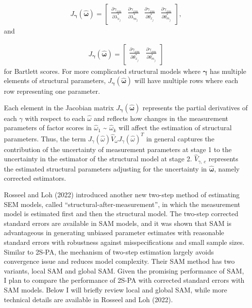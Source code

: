 \documentclass[
  man]{apa7}
\begin{document}
\begin{align}
J_{\boldsymbol{\gamma}}(\boldsymbol{\hat{\omega}}) = 
\begin{bmatrix}
\frac{\partial \gamma_{xm}}{\partial \lambda_{x_{j}}^*} & \frac{\partial \gamma_{xm}}{\partial \lambda_{m_{j}}^*} & \frac{\partial \gamma_{xm}}{\partial \theta_{x_{j}}^*} & \frac{\partial \gamma_{xm}}{\partial \theta_{m_{j}}^*}
\end{bmatrix},
\end{align}
and

\begin{align}
J_{\boldsymbol{\gamma}}(\boldsymbol{\hat{\omega}}) = 
\begin{bmatrix}
\frac{\partial \gamma_{xm}}{\partial \theta_{x_{j}}^*} & \frac{\partial \gamma_{xm}}{\partial \theta_{m_{j}}^*}
\end{bmatrix}
\end{align}
for Bartlett scores. For more complicated structural models where \(\boldsymbol{\gamma}\) has multiple elements of structural parameters, \(J_{\boldsymbol{\gamma}}(\boldsymbol{\hat{\omega}})\) will have multiple rows where each row representing one parameter.

Each element in the Jacobian matrix \(J_{\boldsymbol{\gamma}}(\boldsymbol{\hat{\omega}})\) represents the partial derivatives of each \(\gamma\) with respect to each \(\hat{\omega}\) and reflects how changes in the measurement parameters of factor scores in \(\hat{\omega}_{1}\) \textasciitilde{} \(\hat{\omega}_{k}\) will affect the estimation of structural parameters. Thus, the term \(J_{\gamma}(\hat{\omega}) \hat{V}_{\omega} J_{\gamma}(\hat{\omega})^T\) in general captures the contribution of the uncertainty of measurement parameters at stage 1 to the uncertainty in the estimator of the structural model at stage 2. \(\hat{V}_{\gamma,\ c}\) represents the estimated structural parameters adjusting for the uncertainty in \(\boldsymbol{\hat{\omega}}\), namely corrected estimators.

Rosseel and Loh (2022) introduced another new two-step method of estimating SEM models, called ``structural-after-measurement'', in which the measurement model is estimated first and then the structural model. The two-step corrected standard errors are available in SAM models, and it was shown that SAM is advantageous in generating unbiased parameter estimates with reasonable standard errors with robustness against misspecifications and small sample sizes. Similar to 2S-PA, the mechanism of two-step estimation largely avoids convergence issue and reduces model complexity. Their SAM method has two variants, local SAM and global SAM. Given the promising performance of SAM, I plan to compare the performance of 2S-PA with corrected standard errors with SAM models. Below I will briefly review local and global SAM, while more technical details are available in Rosseel and Loh (2022).
\end{document}
